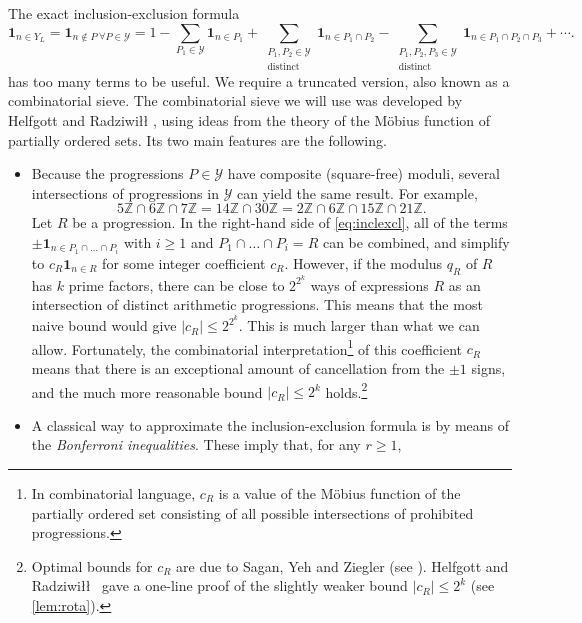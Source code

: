\documentclass[11pt]{amsart}
\theoremstyle{definition}
\renewcommand{\leq}{\leqslant}
\renewcommand{\geq}{\geqslant}
\newcommand{\abs}[1]{\left|#1\right|}
\newcommand{\ind}[1]{\mathbf{1}_{#1}}
\newcommand{\Z}{\mathbb{Z}}
\newcommand{\elln}{L}
\newcommand{\Y}{Y_{\!\elln}}
\newcommand{\prohibprog}{\mathcal{Y}}
\newcommand{\modulus}{q}
\begin{document}
The exact inclusion-exclusion formula
\begin{equation}
\label{eq:inclexcl}
	\ind{n\in \Y} = \ind{n\not\in P\ \forall P\in \prohibprog} = 1 - \sum_{P_1\in \prohibprog} \ind{n\in P_1} + \sum_{\substack{P_1, P_2\in \prohibprog\\ \text{distinct}}} \ind{n\in P_1 \cap P_2} - \sum_{\substack{P_1, P_2, P_3\in \prohibprog\\ \text{distinct}}} \ind{n\in P_1 \cap P_2\cap P_3} + \cdots.
\end{equation} 
has too many terms to be useful. We require a truncated version, also known as a combinatorial sieve. The combinatorial sieve we will use was developed by Helfgott and Radziwiłł \cite{HR}, using ideas from the theory of the Möbius function of partially ordered sets. Its two main features are the following.
\begin{itemize}
	\item Because the progressions $P\in \prohibprog$ have composite (square-free) moduli, several intersections of progressions in $\prohibprog$ can yield the same result. For example,
	\begin{equation*}
		5\Z \cap 6\Z \cap 7\Z= 14\Z \cap 30\Z= 2\Z \cap 6\Z \cap 15\Z \cap 21\Z.
	\end{equation*}
	Let $R$ be a progression. In the right-hand side of \cref{eq:inclexcl}, all of the terms $\pm \ind{n\in P_1\cap \ldots \cap P_i}$ with $i\geq 1$ and $P_1\cap \ldots \cap P_i = R$ can be combined, and simplify to $c_R \ind{n\in R}$ for some integer coefficient $c_R$. However, if the modulus $\modulus_{R}$ of $R$ has $k$ prime factors, there can be close to $2^{2^k}$ ways of expressions $R$ as an intersection of distinct arithmetic progressions. This means that the most naive bound would give $\abs{c_R} \leq 2^{2^k}$. This is much larger than what we can allow. Fortunately, the combinatorial interpretation\footnote{In combinatorial language, $c_R$ is a value of the Möbius function of the partially ordered set consisting of all possible intersections of prohibited progressions.} of this coefficient $c_R$ means that there is an exceptional amount of cancellation from the $\pm1$ signs, and the much more reasonable bound $\abs{c_R} \leq 2^k$ holds.\footnote{Optimal bounds for $c_R$ are due to Sagan, Yeh and Ziegler (see \cite[after Corollary~2.5]{mobius}). Helfgott and Radziwiłł~\cite{HR} gave a one-line proof of the slightly weaker bound $\abs{c_R} \leq 2^k$ (see \cref{lem:rota}).}
	\item A classical way to approximate the inclusion-exclusion formula is by means of the \emph{Bonferroni inequalities}. These imply that, for any $r\geq 1$,

\end{itemize}
\end{document}
